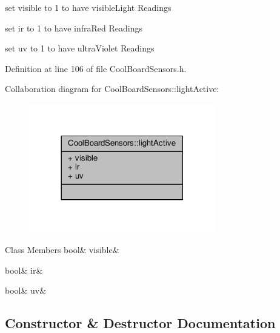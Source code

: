 set visible to 1 to have visible\+Light Readings

set ir to 1 to have infra\+Red Readings

set uv to 1 to have ultra\+Violet Readings 

Definition at line 106 of file Cool\+Board\+Sensors.\+h.



Collaboration diagram for Cool\+Board\+Sensors\+:\+:light\+Active\+:
\nopagebreak
\begin{figure}[H]
\begin{center}
\leavevmode
\includegraphics[width=230pt]{de/d9f/struct_cool_board_sensors_1_1light_active__coll__graph}
\end{center}
\end{figure}
\begin{DoxyFields}{Class Members}
\mbox{\label{class_cool_board_sensors_a9c351100969d0dc055ad2e6712cc7ac8}} 
bool&
visible&
\\
\hline

\mbox{\label{class_cool_board_sensors_a4c21258d3c89c6292740d6deb10f9dcc}} 
bool&
ir&
\\
\hline

\mbox{\label{class_cool_board_sensors_a0e6cfc311425a31f32c32fc3b834ffb8}} 
bool&
uv&
\\
\hline

\end{DoxyFields}


\subsection{Constructor \& Destructor Documentation}
\mbox{\label{class_cool_board_sensors_a91ff2a02f5486f90cf2413a1cf8a9ed4}} 

